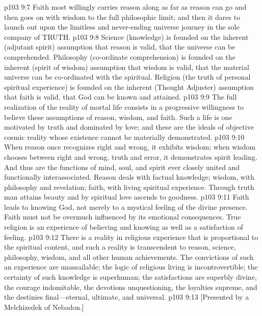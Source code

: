 \vs p103 9:7 Faith most willingly carries reason along as far as reason can go and then goes on with wisdom to the full philosophic limit; and then it dares to launch out upon the limitless and never\hyp{}ending universe journey in the sole company of TRUTH.\plusone
\pc \vs p103 9:8 Science (knowledge) is founded on the inherent (adjutant spirit) assumption that reason is valid, that the universe can be comprehended. Philosophy (co\hyp{}ordinate comprehension) is founded on the inherent (spirit of wisdom) assumption that wisdom is valid, that the material universe can be co\hyp{}ordinated with the spiritual. Religion (the truth of personal spiritual experience) is founded on the inherent (Thought Adjuster) assumption that faith is valid, that God can be known and attained.
\vs p103 9:9 The full realization of the reality of mortal life consists in a progressive willingness to believe these assumptions of reason, wisdom, and faith. Such a life is one motivated by truth and dominated by love; and these are the ideals of objective cosmic reality whose existence cannot be materially demonstrated.
\vs p103 9:10 When reason once recognizes right and wrong, it exhibits wisdom; when wisdom chooses between right and wrong, truth and error, it demonstrates spirit leading. And thus are the functions of mind, soul, and spirit ever closely united and functionally interassociated. Reason deals with factual knowledge; wisdom, with philosophy and revelation; faith, with living spiritual experience. Through truth man attains beauty and by spiritual love ascends to goodness.
\vs p103 9:11 Faith leads to knowing God, not merely to a mystical feeling of the divine presence. Faith must not be overmuch influenced by its emotional consequences. True religion is an experience of believing and knowing as well as a satisfaction of feeling.
\pc \vs p103 9:12 There is a reality in religious experience that is proportional to the spiritual content, and such a reality is transcendent to reason, science, philosophy, wisdom, and all other human achievements. The convictions of such an experience are unassailable; the logic of religious living is incontrovertible; the certainty of such knowledge is superhuman; the satisfactions are superbly divine, the courage indomitable, the devotions unquestioning, the loyalties supreme, and the destinies final---eternal, ultimate, and universal.
\vsetoff
\vs p103 9:13 [Presented by a Melchizedek of Nebadon.]
